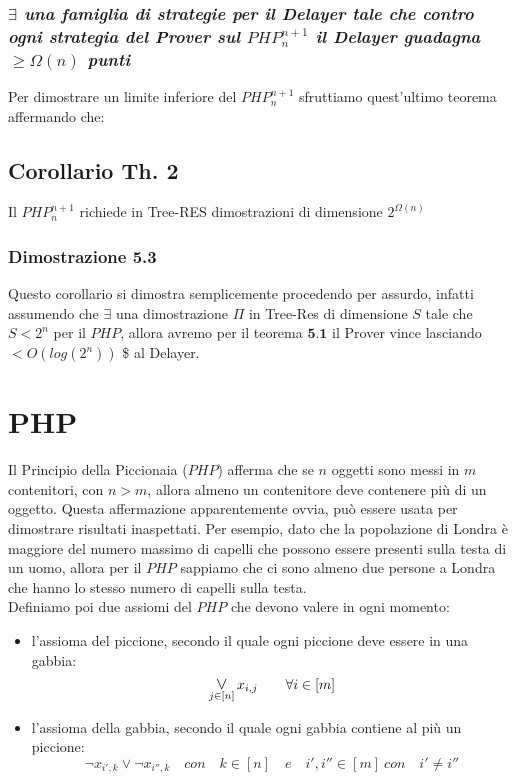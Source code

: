 \documentclass[it]{article}
\begin{document}
        \subsubsection{\emph{$\exists$ una famiglia di strategie per il Delayer tale che contro ogni strategia del Prover sul $PHP_{n}^{n+1}$ il Delayer guadagna $\ge \Omega(n)$ punti }}
    Per dimostrare un limite inferiore del $PHP_{n}^{n+1}$ sfruttiamo quest'ultimo teorema affermando che:
    \subsection{Corollario Th. 2}
    \begin{center}
        Il $PHP_{n}^{n+1}$ richiede in Tree-RES dimostrazioni di dimensione $2^{\Omega(n)}$
    \end{center} 
        \subsubsection{Dimostrazione 5.3}
        Questo corollario si dimostra semplicemente procedendo per assurdo, infatti assumendo che $\exists$ una dimostrazione $\Pi$ in Tree-Res di dimensione ${\displaystyle S}$ tale che $S<2^{n}$ per il ${\displaystyle PHP}$, allora avremo per il teorema $\textbf{5.1}$ il Prover vince lasciando $< O(log(2^{n}))$ \$ al Delayer.

\section{PHP}
Il Principio della Piccionaia ($\displaystyle PHP$) afferma che se $\displaystyle n$ oggetti sono messi in $\displaystyle m$ contenitori, con $\displaystyle n>m$, allora almeno un contenitore deve contenere più di un oggetto. Questa affermazione apparentemente ovvia, può essere usata per dimostrare risultati inaspettati. Per esempio, dato che la popolazione di Londra è maggiore del numero massimo di capelli che possono essere presenti sulla testa di un uomo, allora per il $\displaystyle PHP$ sappiamo che ci sono almeno due persone a Londra che hanno lo stesso numero di capelli sulla testa.\\
Definiamo poi due assiomi del $\displaystyle PHP$ che devono valere in ogni momento:
\begin{itemize}
    \item l'assioma del piccione, secondo il quale ogni piccione deve essere in una gabbia: $$\mathop{\mathlarger{\lor}}_{j \in [n]}x_{i,j} \qquad\forall i \in [m]$$
    \item l'assioma della gabbia, secondo il quale ogni gabbia contiene al più un piccione:
    $$\lnot x_{i',k}\lor \lnot x_{i'',k} \quad con \quad k \in [n] \quad e \quad i',i'' \in [m] \ con \quad i' \ne i''  $$

\end{itemize}
\end{document}

